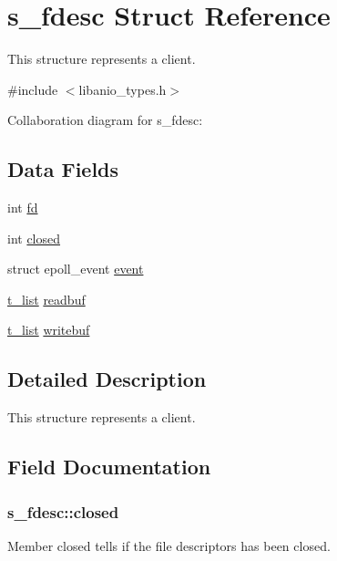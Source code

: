 \hypertarget{structs__fdesc}{}\section{s\+\_\+fdesc Struct Reference}
\label{structs__fdesc}


This structure represents a client.  




{\ttfamily \#include $<$libanio\+\_\+types.\+h$>$}



Collaboration diagram for s\+\_\+fdesc\+:
\subsection*{Data Fields}
\begin{DoxyCompactItemize}
\item 
int \hyperlink{structs__fdesc_a6384ba385a5cf09c6a58bfffe248c257}{fd}
\item 
int \hyperlink{structs__fdesc_a7b5ff006481530a145f43728d1cb0815}{closed}
\item 
struct epoll\+\_\+event \hyperlink{structs__fdesc_ad68cecdfd8e6cc9a0248f79b3e46a393}{event}
\item 
\hyperlink{structs__list}{t\+\_\+list} \hyperlink{structs__fdesc_a387ee6fc84c44f17f50b31ce0f435862}{readbuf}
\item 
\hyperlink{structs__list}{t\+\_\+list} \hyperlink{structs__fdesc_a41f8341d38c99becf10870a1b77655f9}{writebuf}
\end{DoxyCompactItemize}


\subsection{Detailed Description}
This structure represents a client. 

\subsection{Field Documentation}
\hypertarget{structs__fdesc_a7b5ff006481530a145f43728d1cb0815}{}
\subsubsection[{closed}]{\setlength{\rightskip}{0pt plus 5cm}s\+\_\+fdesc\+::closed}\label{structs__fdesc_a7b5ff006481530a145f43728d1cb0815}
Member \textquotesingle{}closed\textquotesingle{} tells if the file descriptors has been closed. \hypertarget{structs__fdesc_ad68cecdfd8e6cc9a0248f79b3e46a393}{}
